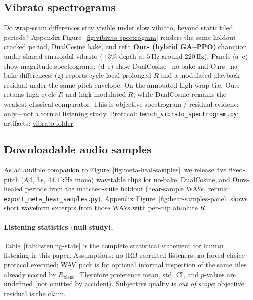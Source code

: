 
\subsection{Vibrato spectrograms}
\label{sec:vibrato-eval}

Do wrap-seam differences stay visible under slow vibrato, beyond static tiled periods?
Appendix Figure~\ref{fig:vibrato-spectrogram} renders the same holdout cracked period, DualCosine bake, and refit \textbf{Ours (hybrid GA--PPO)} champion under shared sinusoidal vibrato ($\pm 3\%$ depth at $5$\,Hz around $220$\,Hz).
Panels (a--c) show magnitude spectrograms; (d--e) show DualCosine$-$no-bake and Ours$-$no-bake differences; (g) reports cycle-local prolonged $R$ and a modulated-playback residual under the same pitch envelope.
On the annotated high-wrap tile, Ours retains high cycle $R$ and high modulated $R$, while DualCosine remains the weakest classical comparator.
This is objective spectrogram / residual evidence only---not a formal listening study.
Protocol:
\href{https://github.com/reeldemo/reelsynth/blob/main/scripts/bench_vibrato_spectrogram.py}{\texttt{bench\_vibrato\_spectrogram.py}};
artifacts:
\href{https://github.com/reeldemo/reelsynth/tree/main/brand/artifacts/vibrato_spectrogram}{vibrato folder}.

\subsection{Downloadable audio samples}
\label{sec:hear-samples}

As an audible companion to Figure~\ref{fig:meta-heal-samples}, we release five fixed-pitch (A4, $3$\,s, $44.1$\,kHz mono) wavetable clips for no-bake, DualCosine, and Ours-healed periods from the matched-suite holdout
(\href{https://github.com/reeldemo/reelsynth/tree/main/brand/artifacts/meta_approach_compare/hear_samples}{hear-sample WAVs},
rebuild:
\href{https://github.com/reeldemo/reelsynth/blob/main/scripts/export_meta_hear_samples.py}{\texttt{export\_meta\_hear\_samples.py}}).
Appendix Figure~\ref{fig:hear-samples-panel} shows short waveform excerpts from those WAVs with per-clip absolute $R$.

\paragraph{Listening statistics (null study).}
Table~\ref{tab:listening-stats} is the complete statistical statement for human listening in this paper.
Assumptions: no IRB-recruited listeners; no forced-choice protocol executed; WAV pack is for optional informal inspection of the same tiles already scored by $R_{\mathrm{blend}}$.
Therefore preference mean, std, CI, and $p$-values are undefined (not omitted by accident).
Subjective quality is \emph{out of scope}; objective residual is the claim.

